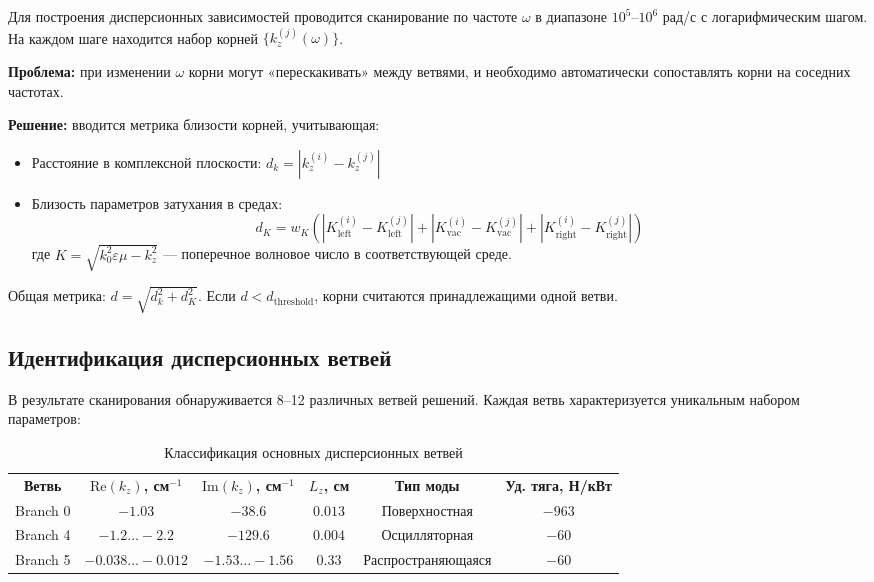 \documentclass[a4paper,12pt]{article}
\begin{document}
Для построения дисперсионных зависимостей проводится сканирование по частоте $\omega$ в диапазоне $10^5$--$10^6$ рад/с с логарифмическим шагом. На каждом шаге находится набор корней $\{k_z^{(j)}(\omega)\}$.

\textbf{Проблема:} при изменении $\omega$ корни могут «перескакивать» между ветвями, и необходимо автоматически сопоставлять корни на соседних частотах.

\textbf{Решение:} вводится метрика близости корней, учитывающая:
\begin{itemize}
    \item Расстояние в комплексной плоскости: $d_k = |k_z^{(i)} - k_z^{(j)}|$
    \item Близость параметров затухания в средах:
    \begin{equation}
    d_K = w_K \left( |K_{\text{left}}^{(i)} - K_{\text{left}}^{(j)}| +
    |K_{\text{vac}}^{(i)} - K_{\text{vac}}^{(j)}| +
    |K_{\text{right}}^{(i)} - K_{\text{right}}^{(j)}| \right)
    \end{equation}
    где $K = \sqrt{k_0^2 \varepsilon \mu - k_z^2}$ --- поперечное волновое число в соответствующей среде.
\end{itemize}

Общая метрика: $d = \sqrt{d_k^2 + d_K^2}$. Если $d < d_{\text{threshold}}$, корни считаются принадлежащими одной ветви.

\subsection{Идентификация дисперсионных ветвей}

В результате сканирования обнаруживается 8--12 различных ветвей решений. Каждая ветвь характеризуется уникальным набором параметров:

\begin{table}[h]
\centering
\caption{Классификация основных дисперсионных ветвей}
\label{tab:branches}
\begin{tabular}{@{}cccccc@{}}
\textbf{Ветвь} & \textbf{$\text{Re}(k_z)$, см$^{-1}$} & \textbf{$\text{Im}(k_z)$, см$^{-1}$} & \textbf{$L_z$, см} & \textbf{Тип моды} & \textbf{Уд. тяга, Н/кВт} \\
Branch 0 & $-1.03$ & $-38.6$ & $0.013$ & Поверхностная & $-963$ \\
Branch 4 & $-1.2 \dots -2.2$ & $-129.6$ & $0.004$ & Осцилляторная & $-60$ \\
Branch 5 & $-0.038 \dots -0.012$ & $-1.53 \dots -1.56$ & $0.33$ & Распространяющаяся & $-60$ \\
\end{tabular}
\end{table}
\end{document}

